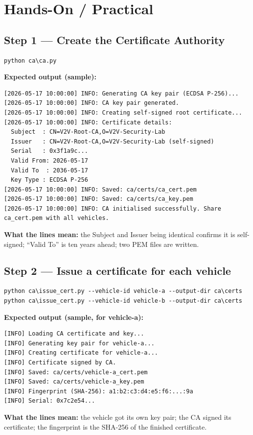 \documentclass[11pt,a4paper]{report}
\begin{document}
\section{Hands-On / Practical}

\subsection{Step 1 --- Create the Certificate Authority}
\begin{lstlisting}[style=term]
python ca\ca.py
\end{lstlisting}
\textbf{Expected output (sample):}
\begin{lstlisting}[style=term]
[2026-05-17 10:00:00] INFO: Generating CA key pair (ECDSA P-256)...
[2026-05-17 10:00:00] INFO: CA key pair generated.
[2026-05-17 10:00:00] INFO: Creating self-signed root certificate...
[2026-05-17 10:00:00] INFO: Certificate details:
  Subject  : CN=V2V-Root-CA,O=V2V-Security-Lab
  Issuer   : CN=V2V-Root-CA,O=V2V-Security-Lab (self-signed)
  Serial   : 0x3f1a9c...
  Valid From: 2026-05-17
  Valid To  : 2036-05-17
  Key Type : ECDSA P-256
[2026-05-17 10:00:00] INFO: Saved: ca/certs/ca_cert.pem
[2026-05-17 10:00:00] INFO: Saved: ca/certs/ca_key.pem
[2026-05-17 10:00:00] INFO: CA initialised successfully. Share ca_cert.pem with all vehicles.
\end{lstlisting}
\textbf{What the lines mean:} the Subject and Issuer being identical confirms it
is self-signed; ``Valid To'' is ten years ahead; two PEM files are written.

\subsection{Step 2 --- Issue a certificate for each vehicle}
\begin{lstlisting}[style=term]
python ca\issue_cert.py --vehicle-id vehicle-a --output-dir ca\certs
python ca\issue_cert.py --vehicle-id vehicle-b --output-dir ca\certs
\end{lstlisting}
\textbf{Expected output (sample, for vehicle-a):}
\begin{lstlisting}[style=term]
[INFO] Loading CA certificate and key...
[INFO] Generating key pair for vehicle-a...
[INFO] Creating certificate for vehicle-a...
[INFO] Certificate signed by CA.
[INFO] Saved: ca/certs/vehicle-a_cert.pem
[INFO] Saved: ca/certs/vehicle-a_key.pem
[INFO] Fingerprint (SHA-256): a1:b2:c3:d4:e5:f6:...:9a
[INFO] Serial: 0x7c2e54...
\end{lstlisting}
\textbf{What the lines mean:} the vehicle got its own key pair; the CA signed its
certificate; the fingerprint is the SHA-256 of the finished certificate.
\end{document}
